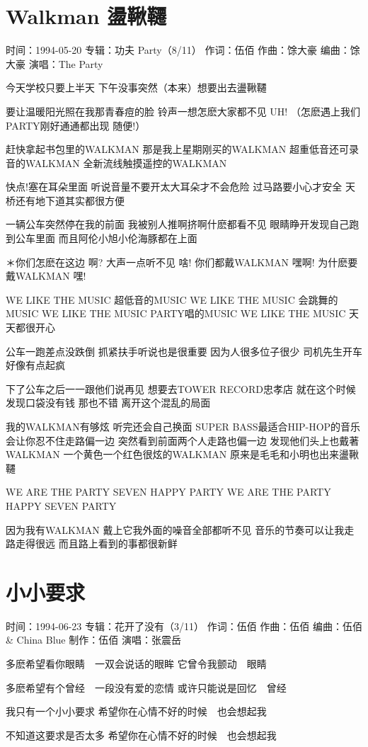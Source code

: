 \documentclass[UTF8,a4paper,oneside,twocolumn,12pt]{ctexbook}
\newcommand{\infopair}[2]{\textbullet #1：#2}
\newcommand{\zc}[1][伍佰]{\infopair{作词}{#1}}
\newcommand{\zq}[1][伍佰]{\infopair{作曲}{#1}}
\newcommand{\bq}[1][伍佰]{\infopair{编曲}{#1}}
\newcommand{\zj}[1]{\infopair{专辑}{#1}}
\newcommand{\zz}[1]{\infopair{制作}{#1}}
\newcommand{\sj}[1]{\infopair{时间}{#1}}
\newenvironment{info}{\begin{flushleft}\kaishu
	}
	{\end{flushleft}\normalsize\yahei\par}
\newenvironment{lyric}{
	}
{}
\begin{document}
\section{Walkman 盪鞦韆}
\begin{info}
	\sj{1994-05-20}
	\zj{功夫 Party（8/11）}
	\zc
	\zq[馀大豪]
	\bq[馀大豪]
	\infopair{演唱}{The Party}
\end{info}
\begin{lyric}
	今天学校只要上半天
	下午没事突然（本来）想要出去盪鞦韆

	要让温暖阳光照在我那青春痘的脸
	铃声一想怎麽大家都不见 UH!
	（怎麽遇上我们PARTY刚好通通都出现 随便!）

	赶快拿起书包里的WALKMAN
	那是我上星期刚买的WALKMAN
	超重低音还可录音的WALKMAN
	全新流线触摸遥控的WALKMAN

	快点!塞在耳朵里面 听说音量不要开太大耳朵才不会危险
	过马路要小心才安全 天桥还有地下道其实都很方便

	一辆公车突然停在我的前面
	我被别人推啊挤啊什麽都看不见
	眼睛睁开发现自己跑到公车里面
	而且阿伦小旭小伦海豚都在上面

	＊你们怎麽在这边 啊?
	大声一点听不见 啥!
	你们都戴WALKMAN 嘿啊!
	为什麽要戴WALKMAN 嘿!

	WE LIKE THE MUSIC 超低音的MUSIC
	WE LIKE THE MUSIC 会跳舞的MUSIC
	WE LIKE THE MUSIC PARTY唱的MUSIC
	WE LIKE THE MUSIC 天天都很开心

	公车一跑差点没跌倒 抓紧扶手听说也是很重要
	因为人很多位子很少 司机先生开车好像有点起疯

	下了公车之后一一跟他们说再见
	想要去TOWER RECORD忠孝店
	就在这个时候发现口袋没有钱 那也不错
	离开这个混乱的局面

	我的WALKMAN有够炫 听完还会自己换面
	SUPER BASS最适合HIP-HOP的音乐
	会让你忍不住走路偏一边 突然看到前面两个人走路也偏一边
	发现他们头上也戴著WALKMAN
	一个黄色一个红色很炫的WALKMAN
	原来是毛毛和小明也出来盪鞦韆

	WE ARE THE PARTY
	SEVEN HAPPY PARTY
	WE ARE THE PARTY
	HAPPY SEVEN PARTY

	因为我有WALKMAN
	戴上它我外面的噪音全部都听不见
	音乐的节奏可以让我走路走得很远
	而且路上看到的事都很新鲜
\end{lyric}

\section{小小要求}
\begin{info}
	\sj{1994-06-23}
	\zj{花开了没有（3/11）}
	\zc
	\zq
	\bq[伍佰 \& China Blue]
	\zz{伍佰}
	\infopair{演唱}{张震岳}
\end{info}
\begin{lyric}
	多麽希望看你眼睛　一双会说话的眼眸
	它曾令我颤动　眼睛

	多麽希望有个曾经　一段没有爱的恋情
	或许只能说是回忆　曾经

	我只有一个小小要求
	希望你在心情不好的时候　也会想起我

	不知道这要求是否太多
	希望你在心情不好的时候　也会想起我
\end{lyric}
\end{document}
